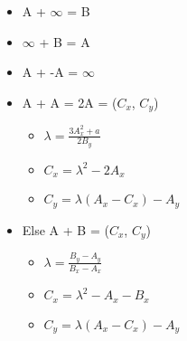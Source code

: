 \begin{itemize}
    \item[] A + $\infty$ = B
    \item[] $\infty$ + B = A
    \item[] A + -A = $\infty$
    \item[] A + A = 2A = ($C_x$, $C_y$)
    \begin{itemize}
        \item[] $\lambda = \frac{3A_x^2 + a} {2B_y}$
        \item[] $C_x = \lambda^2 - 2A_x$
        \item[] $C_y = \lambda(A_x - C_x) - A_y$
    \end{itemize}
    \item[] Else A + B = ($C_x$, $C_y$)
    \begin{itemize}
        \item[] $\lambda = \frac{B_y - A_y} {B_x - A_x}$
        \item[] $C_x = \lambda^2 - A_x - B_x$
        \item[] $C_y = \lambda(A_x - C_x) - A_y$
    \end{itemize}
\end{itemize}

